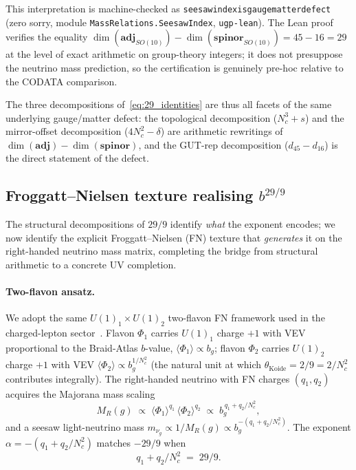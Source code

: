 \documentclass[12pt,a4paper]{article}
\theoremstyle{definition}
\theoremstyle{remark}
\newcommand{\lean}[1]{%
  \penalty-100
  \begingroup\def\_{\textunderscore\allowbreak}\texttt{#1}\endgroup}
\begin{document}
This interpretation is machine-checked as \lean{seesaw\_index\_is\_gauge\_matter\_defect} (zero sorry, module \texttt{MassRelations.SeesawIndex}, \texttt{ugp-lean}).  The Lean proof verifies the equality $\dim(\mathbf{adj}_{SO(10)}) - \dim(\mathbf{spinor}_{SO(10)}) = 45 - 16 = 29$ at the level of exact arithmetic on group-theory integers; it does not presuppose the neutrino mass prediction, so the certification is genuinely pre-hoc relative to the CODATA comparison.

The three decompositions of~\eqref{eq:29_identities} are thus all facets of the same underlying gauge/matter defect: the topological decomposition ($N_c^3 + s$) and the mirror-offset decomposition ($4N_c^2 - \delta$) are arithmetic rewritings of $\dim(\mathbf{adj}) - \dim(\mathbf{spinor})$, and the GUT-rep decomposition ($d_{45} - d_{16}$) is the direct statement of the defect.

\subsection{Froggatt--Nielsen texture realising $b^{29/9}$}
\label{subsec:fn_texture}

The structural decompositions of $29/9$ identify \emph{what} the exponent
encodes; we now identify the explicit Froggatt--Nielsen (FN) texture that
\emph{generates} it on the right-handed neutrino mass matrix, completing
the bridge from structural arithmetic to a concrete UV completion.

\paragraph{Two-flavon ansatz.}
We adopt the same $U(1)_1 \times U(1)_2$ two-flavon FN framework used in the
charged-lepton sector~\cite{Spivack2026_CyclotomicMass}.  Flavon $\Phi_1$
carries $U(1)_1$ charge $+1$ with VEV proportional to the Braid-Atlas $b$-value,
$\langle \Phi_1\rangle \propto b_g$; flavon $\Phi_2$ carries $U(1)_2$ charge
$+1$ with VEV $\langle\Phi_2\rangle \propto b_g^{1/N_c^2}$ (the natural unit at
which $\theta_{\mathrm{Koide}} = 2/9 = 2/N_c^2$ contributes integrally).
The right-handed neutrino with FN charges $(q_1, q_2)$ acquires the Majorana
mass scaling
\begin{equation}
  M_R(g) \;\propto\; \langle\Phi_1\rangle^{q_1}\,\langle\Phi_2\rangle^{q_2}
  \;\propto\; b_g^{\,q_1 + q_2 / N_c^2},
  \label{eq:fn_MR}
\end{equation}
and a seesaw light-neutrino mass $m_{\nu_g} \propto 1/M_R(g) \propto b_g^{-(q_1+q_2/N_c^2)}$.
The exponent $\alpha = -(q_1 + q_2/N_c^2)$ matches $-29/9$ when
\begin{equation}
  q_1 + q_2/N_c^2 \;=\; 29/9.
  \label{eq:fn_match}
\end{equation}
\end{document}
